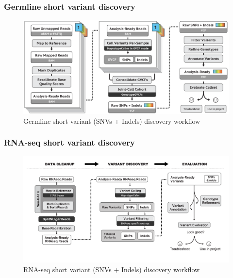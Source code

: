 \documentclass{beamer}
\begin{document}
    \begin{frame}
        \frametitle{Germline short variant discovery}

        \begin{figure}
            \includegraphics[width=0.7 \linewidth]{figures/Workflow/germline_short_variant.png}
            \caption{Germline short variant (SNVs + Indels) discovery workflow \protect\cite{gatk1, gatk2}}
        \end{figure}
    \end{frame}

    \begin{frame}
        \frametitle{RNA-seq short variant discovery}

        \begin{figure}
            \includegraphics[width=0.8 \linewidth]{figures/Workflow/RNA_short_variant.png}
            \caption{RNA-seq short variant (SNVs + Indels) discovery workflow \protect\cite{gatk1, gatk2}}
        \end{figure}
    \end{frame}
\end{document}
